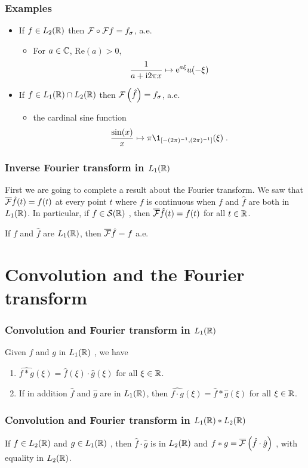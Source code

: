 \begin{frame}
\frametitle{Examples}
\begin{itemize}
\item If $f \in L_2(\mathbb{R})$ then $\mathcal{F} \circ \mathcal{F} f= f_\sigma$, a.e.
\begin{itemize}
\item  For $a \in \mathbb{C}$, $\mathrm{Re}(a) > 0$,
\[
\frac{1}{a+ \mathrm{i} 2 \pi x} \mapsto \mathrm{e}^{a \xi} u(-\xi)
\]
\end{itemize}
\item If $f \in L_1(\mathbb{R}) \cap L_2(\mathbb{R})$ then $\mathcal{F}\left( \hat{f} \right)= f_\sigma$, a.e. 
\begin{itemize}
\item  the cardinal sine function
\[
\frac{\sin(x)}{x} \mapsto \pi \1_{\ccint{-(2\pi)^{-1},(2\pi)^{-1}}}(\xi) \eqsp.
\]
\end{itemize}
\end{itemize}
\end{frame}

\begin{frame}
\frametitle{Inverse Fourier transform in $L_1(\mathbb{R})$}
First we are going to complete a result about the Fourier transform. We saw  that $\overline{\mathcal{F}} \hat{f}(t)=f(t)$ at every point $t$ where $f$ is continuous when $f$ and $\hat{f}$  are both in $L_1(\mathbb{R})$. In particular, if $ f\in \mathcal{S}(\mathbb{R})$ , then $\overline{\mathcal{F}} \hat{f}(t)=f(t)$ for all $ t\in \mathbb{R}$. 

\begin{theorem}
If $f$ and $\hat{f}$ are $L_1(\mathbb{R})$, then $\overline{\mathcal{F}} \hat{f}=f$ a.e.
\end{theorem}
\end{frame}

\section{Convolution and the Fourier transform}
\begin{frame}
\frametitle{Convolution and Fourier transform in $L_1(\mathbb{R})$}
\begin{theorem}
Given $f$ and $g$ in $L_1(\mathbb{R})$ , we have 
\begin{enumerate}[label=(\roman*)]
\item $\widehat{f*g}(\xi)=\hat{f}(\xi)\cdot\hat{g}(\xi)$  for all $\xi \in \mathbb{R}$.
\item If in addition $\hat{f}$ and $\hat{g}$ are in $L_1(\mathbb{R})$, then
$\widehat{f\cdot g}(\xi)=\hat{f}*\hat{g}(\xi)$ for all $\xi\in \mathbb{R}$.
\end{enumerate}
\end{theorem}

\end{frame}

\begin{frame}
\frametitle{Convolution and Fourier transform in $L_1(\mathbb{R}) * L_2(\mathbb{R})$}
\begin{theorem}
If $ f\in L_2(\mathbb{R})$ and $g\in L_1(\mathbb{R})$ , then $\hat{f}\cdot\hat{g}$  is in $L_2(\mathbb{R})$  and $f*g=\overline{\mathcal{F}}\left( \hat{f}\cdot\hat{g} \right)$ , with  equality in $L_2(\mathbb{R})$.
\end{theorem}
\end{frame}


 